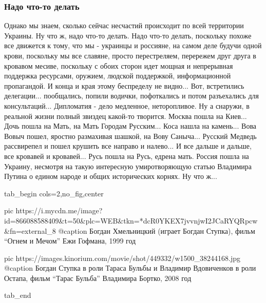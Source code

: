  
 
 
 
 

\subsubsection{Надо что-то делать}

Однако мы знаем, сколько сейчас несчастий происходит по всей территории
Украины. Ну что ж, надо что-то делать. Надо что-то делать, поскольку похоже все
движется к тому, что мы - украинцы и россияне, на самом деле будучи одной
крови, поскольку мы все славяне, просто перестреляем, перережем друг друга в
кровавом месиве, поскольку с обоих сторон идет мощная и непрерывная поддержка
ресурсами, оружием, людской поддержкой, информационной пропагандой. И конца и
края этому беспределу не видно... Вот, встретились делегации... пообщались,
попили водички, пофоткались и потом разъехались для консультаций... Дипломатия
- дело медленное, неторопливое. Ну а снаружи, в реальной жизни полный звиздец
какой-то творится. Москва пошла на Киев... Дочь пошла на Мать, на Мать Городам
Русским... Коса нашла на камень... Вова Вовыч пошел, яростно размахивая шашкой,
на Вову Саныча... Русский Медведь рассвирепел и пошел крушить все направо и
налево... И все дальше и дальше, все кровавей и кровавей... Русь пошла на Русь,
едрена мать. Россия пошла на Украину, несмотря на такую интересную
умиротворяющую статью Владимира Путина о едином народе и общих исторических
корнях. Ну что ж... 

\ifcmt
  tab_begin cols=2,no_fig,center

		 pic https://i.mycdn.me/image?id=866088588409&t=50&plc=WEB&tkn=*dcR0YKEX7jvvnjwI2JCaRYQRpcw&fn=external_8
		 @caption Богдан Хмельницкий (играет Богдан Ступка), фильм \enquote{Огнем и Мечом} Ежи Гофмана, 1999 год

		 pic https://images.kinorium.com/movie/shot/449332/w1500_38244168.jpg
		 @caption Богдан Ступка в роли Тараса Бульбы и Владимир Вдовиченков в роли Остапа, фильм \enquote{Тарас Бульба} Владимира Бортко, 2008 год

  tab_end
\fi

